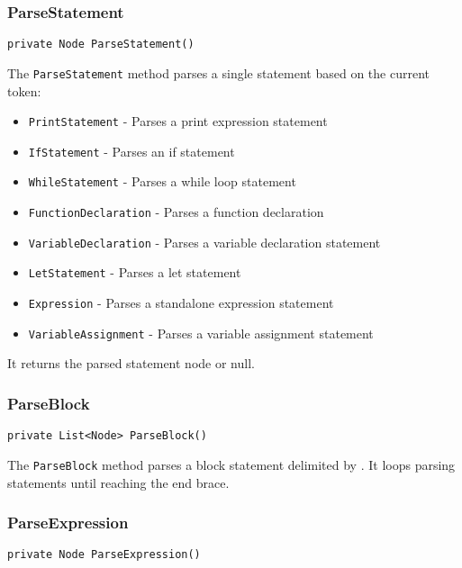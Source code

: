 \documentclass{article}
\begin{document}
\subsubsection{ParseStatement}

\begin{lstlisting}[language={[Sharp]C}]
private Node ParseStatement()
\end{lstlisting}

The \texttt{ParseStatement} method parses a single statement based on the current token:
\begin{itemize}
\item \texttt{PrintStatement} - Parses a print expression statement
\item \texttt{IfStatement} - Parses an if statement
\item \texttt{WhileStatement} - Parses a while loop statement
\item \texttt{FunctionDeclaration} - Parses a function declaration
\item \texttt{VariableDeclaration} - Parses a variable declaration statement
\item \texttt{LetStatement} - Parses a let statement
\item \texttt{Expression} - Parses a standalone expression statement
\item \texttt{VariableAssignment} - Parses a variable assignment statement
\end{itemize}
It returns the parsed statement node or null.


\subsubsection{ParseBlock}

\begin{lstlisting}[language={[Sharp]C}]
private List<Node> ParseBlock()
\end{lstlisting}

The \texttt{ParseBlock} method parses a block statement delimited by {}. It loops parsing statements until reaching the end brace.


\subsubsection{ParseExpression}

\begin{lstlisting}[language={[Sharp]C}]
private Node ParseExpression()
\end{lstlisting}
\end{document}
